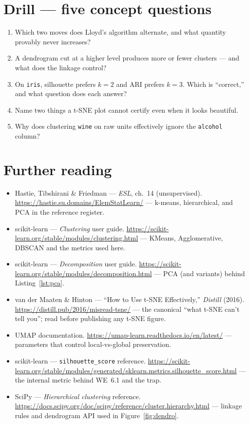 \section{Drill --- five concept questions}

\begin{enumerate}
\item Which two moves does Lloyd's algorithm alternate, and what
  quantity provably never increases?
\item A dendrogram cut at a higher level produces more or fewer
  clusters --- and what does the linkage control?
\item On \texttt{iris}, silhouette prefers $k{=}2$ and ARI prefers
  $k{=}3$. Which is ``correct,'' and what question does each answer?
\item Name two things a t-SNE plot cannot certify even when it looks
  beautiful.
\item Why does clustering \texttt{wine} on raw units effectively ignore
  the \texttt{alcohol} column?
\end{enumerate}

\section*{Further reading}
\begin{itemize}
\item Hastie, Tibshirani \& Friedman --- \emph{ESL}, ch.~14
  (unsupervised). \url{https://hastie.su.domains/ElemStatLearn/} ---
  k-means, hierarchical, and PCA in the reference register.
\item scikit-learn --- \emph{Clustering} user guide.
  \url{https://scikit-learn.org/stable/modules/clustering.html} ---
  KMeans, Agglomerative, DBSCAN and the metrics used here.
\item scikit-learn --- \emph{Decomposition} user guide.
  \url{https://scikit-learn.org/stable/modules/decomposition.html} ---
  PCA (and variants) behind Listing~\ref{lst:pca}.
\item van der Maaten \& Hinton --- ``How to Use t-SNE Effectively,''
  \emph{Distill} (2016). \url{https://distill.pub/2016/misread-tsne/} ---
  the canonical ``what t-SNE can't tell you''; read before publishing
  any t-SNE figure.
\item UMAP documentation. \url{https://umap-learn.readthedocs.io/en/latest/}
  --- parameters that control local-vs-global preservation.
\item scikit-learn --- \texttt{silhouette\_score} reference.
  \url{https://scikit-learn.org/stable/modules/generated/sklearn.metrics.silhouette_score.html}
  --- the internal metric behind WE~6.1 and the trap.
\item SciPy --- \emph{Hierarchical clustering} reference.
  \url{https://docs.scipy.org/doc/scipy/reference/cluster.hierarchy.html}
  --- linkage rules and dendrogram API used in Figure~\ref{fig:dendro}.
\end{itemize}

